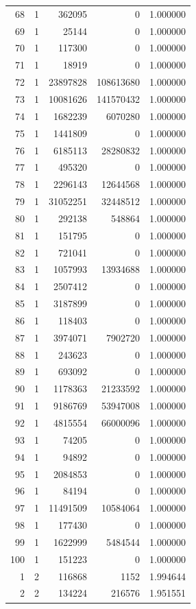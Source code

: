 \begin{longtable}{rrrrr}
68 & 1 & 362095 & 0 & 1.000000\\
69 & 1 & 25144 & 0 & 1.000000\\
70 & 1 & 117300 & 0 & 1.000000\\
71 & 1 & 18919 & 0 & 1.000000\\
72 & 1 & 23897828 & 108613680 & 1.000000\\
73 & 1 & 10081626 & 141570432 & 1.000000\\
74 & 1 & 1682239 & 6070280 & 1.000000\\
75 & 1 & 1441809 & 0 & 1.000000\\
76 & 1 & 6185113 & 28280832 & 1.000000\\
77 & 1 & 495320 & 0 & 1.000000\\
78 & 1 & 2296143 & 12644568 & 1.000000\\
79 & 1 & 31052251 & 32448512 & 1.000000\\
80 & 1 & 292138 & 548864 & 1.000000\\
81 & 1 & 151795 & 0 & 1.000000\\
82 & 1 & 721041 & 0 & 1.000000\\
83 & 1 & 1057993 & 13934688 & 1.000000\\
84 & 1 & 2507412 & 0 & 1.000000\\
85 & 1 & 3187899 & 0 & 1.000000\\
86 & 1 & 118403 & 0 & 1.000000\\
87 & 1 & 3974071 & 7902720 & 1.000000\\
88 & 1 & 243623 & 0 & 1.000000\\
89 & 1 & 693092 & 0 & 1.000000\\
90 & 1 & 1178363 & 21233592 & 1.000000\\
91 & 1 & 9186769 & 53947008 & 1.000000\\
92 & 1 & 4815554 & 66000096 & 1.000000\\
93 & 1 & 74205 & 0 & 1.000000\\
94 & 1 & 94892 & 0 & 1.000000\\
95 & 1 & 2084853 & 0 & 1.000000\\
96 & 1 & 84194 & 0 & 1.000000\\
97 & 1 & 11491509 & 10584064 & 1.000000\\
98 & 1 & 177430 & 0 & 1.000000\\
99 & 1 & 1622999 & 5484544 & 1.000000\\
100 & 1 & 151223 & 0 & 1.000000\\
1 & 2 & 116868 & 1152 & 1.994644\\
2 & 2 & 134224 & 216576 & 1.951551\\

\end{longtable}
